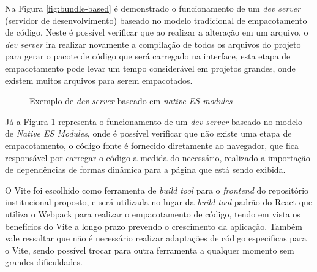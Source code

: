 Na Figura \ref{fig:bundle-based} é demonstrado o funcionamento de um \emph{dev server}
(servidor de desenvolvimento) baseado no modelo tradicional de empacotamento de código.
Neste é possível verificar que ao realizar a alteração em um arquivo, o \emph{dev server}
ira realizar novamente a compilação de todos os arquivos do projeto para gerar o pacote
de código que será carregado na interface, esta etapa de empacotamento pode levar um tempo
considerável em projetos grandes, onde existem muitos arquivos para serem empacotados.

\begin{figure}[H]
    \caption{Exemplo de \emph{dev server} baseado em \emph{native ES modules}}
    \centering
    \label{fig:esm-based}
\end{figure}

Já a Figura \ref{fig:esm-based} representa o funcionamento de um \emph{dev server}
baseado no modelo de \emph{Native ES Modules}, onde é possível verificar que
não existe uma etapa de empacotamento, o código fonte é fornecido diretamente
ao navegador, que fica responsável por carregar o código a medida do necessário,
realizado a importação de dependências de formas dinâmica para a página que está
sendo exibida.

O Vite foi escolhido como ferramenta de \emph{build tool} para o \emph{frontend}
do repositório institucional proposto, e será utilizada no lugar da \emph{build tool}
padrão do React que utiliza o Webpack para realizar o empacotamento de código,
tendo em vista os benefícios do Vite a longo prazo prevendo o crescimento da aplicação.
Também vale ressaltar que não é necessário realizar adaptações de código especificas
para o Vite, sendo possível trocar para outra ferramenta a qualquer momento sem
grandes dificuldades.

